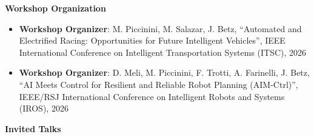 \vspace{0.2cm}
{\large\bfseries\sffamily Workshop Organization}

\begin{itemize}
    \item \textbf{Workshop Organizer}: M. Piccinini, M. Salazar, J. Betz, ``Automated and Electrified Racing: Opportunities for Future Intelligent Vehicles'', IEEE International Conference on Intelligent Transportation Systems (ITSC), 2026
    \item \textbf{Workshop Organizer}: D. Meli, M. Piccinini, F. Trotti, A. Farinelli, J. Betz, ``AI Meets Control for Resilient and Reliable Robot Planning (AIM-Ctrl)'', IEEE/RSJ International Conference on Intelligent Robots and Systems (IROS), 2026
\end{itemize}


\newpage
{\large\bfseries\sffamily Invited Talks}


